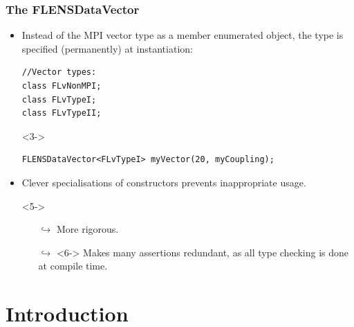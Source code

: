 \documentclass[10pt, a4paper, mathserif]{beamer} %
\newcommand{\<}{$\langle$}
\newcommand{\>}{$\rangle$}
\begin{document}
\begin{frame}[fragile]
\frametitle{The FLENSDataVector}
\begin{itemize}
	\item <2-> Instead of the MPI vector type as a member enumerated object, the type is specified (permanently) at instantiation:
	\begin{lstlisting}
//Vector types:
class FLvNonMPI;
class FLvTypeI;
class FLvTypeII;
	\end{lstlisting}
	\item[] <3-> 
	\begin{lstlisting}
FLENSDataVector<FLvTypeI> myVector(20, myCoupling);
\end{lstlisting}
	\item <4-> Clever specialisations of constructors prevents inappropriate usage.
	\item[] <5->
	\vspace{0.3cm}
	\begin{itemize}
		\item[$\hookrightarrow$] More rigorous.
		\vspace{0.1cm}
		\item[$\hookrightarrow$] <6-> Makes many assertions redundant, as all type checking is done at compile time.
	\end{itemize}
	
\end{itemize}
\end{frame}
	
\section{Introduction}
\end{document}
